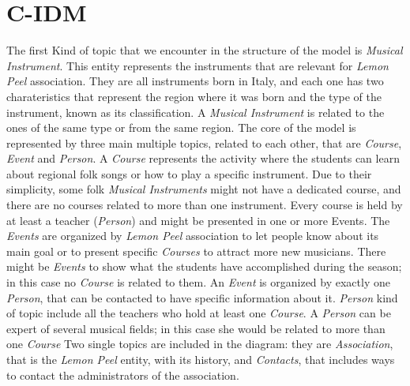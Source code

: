 \documentclass[../../DD.tex]{subfiles}
\begin{document}
\section{C-IDM}
	The first Kind of topic that we encounter in the structure of the model is \textit{Musical Instrument}. This entity represents the instruments that are relevant for \textit{Lemon Peel} association. They are all instruments born in Italy, and each one has two charateristics that represent the region where it was born and the type of the instrument, known as its classification. A \textit{Musical Instrument} is related to the ones of the same type or from the same region.
	\newline
	The core of the model is represented by three main multiple topics, related to each other, that are \textit{Course}, \textit{Event} and \textit{Person}. A \textit{Course} represents the activity where the students can learn about regional folk songs or how to play a specific instrument. Due to their simplicity, some folk \textit{Musical Instruments} might not have a dedicated course, and there are no courses related to more than one instrument. Every course is held by at least a teacher (\textit{Person}) and might be presented in one or more Events.
	\newline
	The \textit{Events} are organized by \textit{Lemon Peel} association to let people know about its main goal or to present specific \textit{Courses} to attract more new musicians. There might be \textit{Events} to show what the students have accomplished during the season; in this case no \textit{Course} is related to them. An \textit{Event} is organized by exactly one \textit{Person}, that can be contacted to have specific information about it. 
	\newline
	\textit{Person} kind of topic include all the teachers who hold at least one \textit{Course}. A \textit{Person} can be expert of several musical fields; in this case she would be related to more than one \textit{Course}
	\newline
	Two single topics are included in the diagram: they are \textit{Association}, that is the \textit{Lemon Peel} entity, with its history, and \textit{Contacts}, that includes ways to contact the administrators of the association.
	\newline
\end{document}
